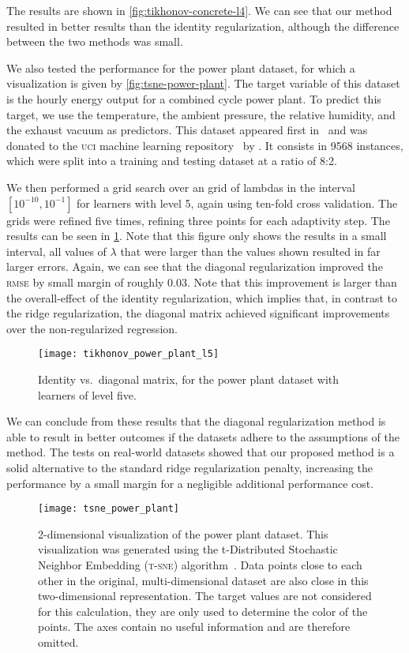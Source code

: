 The results are shown in \cref{fig:tikhonov-concrete-l4}.
We can see that our method resulted in better results than the identity
regularization, although the difference between the two methods was small.

We also tested the performance for the power plant dataset, for which a visualization is given by \vref{fig:tsne-power-plant}.
The target variable of this dataset is the hourly energy output for a combined
cycle power plant.
To predict this target, we use the temperature, the ambient pressure, the
relative humidity, and the exhaust vacuum as predictors.
This dataset appeared first in~\cite{datasets-powerplant} and was donated to the
\textsc{uci} machine learning repository~\cite{datasets-uci} by \citeauthor{datasets-powerplant}.
It consists in 9568 instances, which were split into a training and testing
dataset at a ratio of 8:2.

We then performed a grid search over an grid of lambdas in the interval
\([10^{-10}, 10^{-1}]\) for learners with level 5, again using ten-fold cross validation.
The grids were refined five times, refining three points for each adaptivity step.
The results can be seen in \cref{fig:tikhonov-power-plant-l5}.
Note that this figure only shows the results in a small interval, all values of
\(\lambda\) that were larger than the values shown resulted in far larger
errors.
Again, we can see that the diagonal regularization improved the \textsc{rmse} by
small margin of roughly 0.03.
Note that this improvement is larger than the overall-effect of the identity
regularization, which implies that, in contrast to the ridge regularization, the
diagonal matrix achieved significant improvements over the non-regularized regression.

\begin{figure}[htb]
  \centering
  \texttt{[image: tikhonov\_power\_plant\_l5]}
  \caption{Identity vs.~diagonal matrix, for the power plant dataset with
    learners of level five.}
  \label{fig:tikhonov-power-plant-l5}
\end{figure}

We can conclude from these results that the diagonal regularization method is
able to result in better outcomes if the datasets adhere to the assumptions of
the method.
The tests on real-world datasets showed that our proposed method is a solid alternative
to the standard ridge regularization penalty, increasing the performance by a
small margin for a negligible additional performance cost.
\begin{figure}[htb]
  \centering
  \texttt{[image: tsne\_power\_plant]}
  \caption{
2-dimensional visualization of the power plant dataset. This visualization was generated using the t-Distributed Stochastic Neighbor Embedding (\textsc{t-sne}) algorithm~\cite{tsne}. Data points close to each other in the
  original, multi-dimensional dataset are also close in this two-dimensional
  representation. The target values are not considered for this calculation, they
are only used to determine the color of the points. The axes contain no useful
information and are therefore omitted.
}
  \label{fig:tsne-power-plant}
\end{figure}
\FloatBarrier{}
